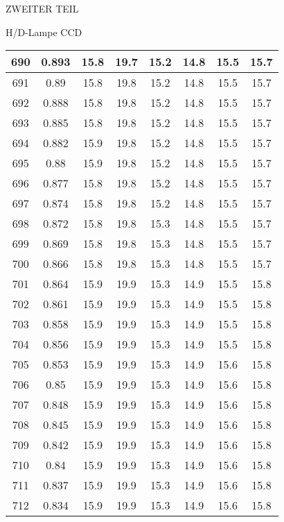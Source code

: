 \begin{appendix}
\begin{chapter}{ZWEITER TEIL}
\begin{section}{H/D-Lampe CCD}
\begin{scriptsize}
\begin{longtable}[htbp]{|c|c|c|c|c|c|c|c|}
            690 & 0.893 & 15.8 & 19.7 & 15.2 & 14.8 & 15.5 & 15.7 \\ \hline
            691 & 0.89 & 15.8 & 19.8 & 15.2 & 14.8 & 15.5 & 15.7 \\ \hline
            692 & 0.888 & 15.8 & 19.8 & 15.2 & 14.8 & 15.5 & 15.7 \\ \hline
            693 & 0.885 & 15.8 & 19.8 & 15.2 & 14.8 & 15.5 & 15.7 \\ \hline
            694 & 0.882 & 15.9 & 19.8 & 15.2 & 14.8 & 15.5 & 15.7 \\ \hline
            695 & 0.88 & 15.9 & 19.8 & 15.2 & 14.8 & 15.5 & 15.7 \\ \hline
            696 & 0.877 & 15.8 & 19.8 & 15.2 & 14.8 & 15.5 & 15.7 \\ \hline
            697 & 0.874 & 15.8 & 19.8 & 15.2 & 14.8 & 15.5 & 15.7 \\ \hline
            698 & 0.872 & 15.8 & 19.8 & 15.3 & 14.8 & 15.5 & 15.7 \\ \hline
            699 & 0.869 & 15.8 & 19.8 & 15.3 & 14.8 & 15.5 & 15.7 \\ \hline
            700 & 0.866 & 15.8 & 19.8 & 15.3 & 14.8 & 15.5 & 15.7 \\ \hline
            701 & 0.864 & 15.9 & 19.9 & 15.3 & 14.9 & 15.5 & 15.8 \\ \hline
            702 & 0.861 & 15.9 & 19.9 & 15.3 & 14.9 & 15.5 & 15.8 \\ \hline
            703 & 0.858 & 15.9 & 19.9 & 15.3 & 14.9 & 15.5 & 15.8 \\ \hline
            704 & 0.856 & 15.9 & 19.9 & 15.3 & 14.9 & 15.5 & 15.8 \\ \hline
            705 & 0.853 & 15.9 & 19.9 & 15.3 & 14.9 & 15.6 & 15.8 \\ \hline
            706 & 0.85 & 15.9 & 19.9 & 15.3 & 14.9 & 15.6 & 15.8 \\ \hline
            707 & 0.848 & 15.9 & 19.9 & 15.3 & 14.9 & 15.6 & 15.8 \\ \hline
            708 & 0.845 & 15.9 & 19.9 & 15.3 & 14.9 & 15.6 & 15.8 \\ \hline
            709 & 0.842 & 15.9 & 19.9 & 15.3 & 14.9 & 15.6 & 15.8 \\ \hline
            710 & 0.84 & 15.9 & 19.9 & 15.3 & 14.9 & 15.6 & 15.8 \\ \hline
            711 & 0.837 & 15.9 & 19.9 & 15.3 & 14.9 & 15.6 & 15.8 \\ \hline
            712 & 0.834 & 15.9 & 19.9 & 15.3 & 14.9 & 15.6 & 15.8 \\ \hline

\end{longtable}
\end{scriptsize}
\end{section}
\end{chapter}
\end{appendix}
